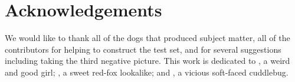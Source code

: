   
  
  
\ifuseacknowledgement
\section{Acknowledgements}
We would like to thank all of the dogs that produced subject matter, all of the contributors for helping to
  construct the test set, and  for several suggestions including taking the third
  negative picture.
This work is dedicated to , a weird and good girl; , a sweet red-fox lookalike;
  and , a vicious soft-faced cuddlebug.

\fi


